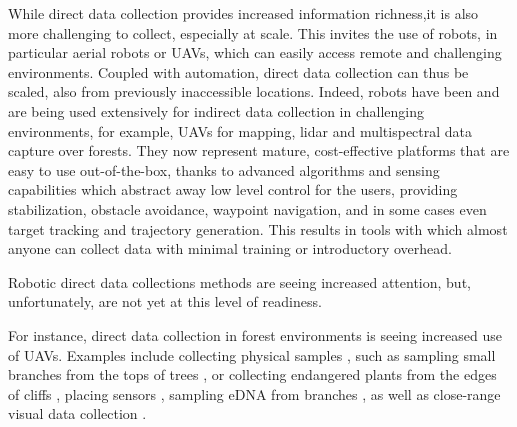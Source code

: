 




While direct data collection provides increased information richness,it is also more challenging to collect, especially at scale. 
This invites the use of robots, in particular aerial robots or UAVs, which can easily access remote and challenging environments. Coupled with automation, direct data collection can thus be scaled, also from previously inaccessible locations.
Indeed, robots have been and are being used extensively for indirect data collection in challenging environments, for example, UAVs for mapping, lidar and multispectral data capture over forests. They now represent mature, cost-effective platforms that are easy to use out-of-the-box, thanks to advanced algorithms and sensing capabilities which abstract away low level control for the users, providing stabilization, obstacle avoidance, waypoint navigation, and in some cases even target tracking and trajectory generation. This results in tools with which almost anyone can collect data with minimal training or introductory overhead. 

Robotic direct data collections methods are seeing increased attention, but, unfortunately, are not yet at this level of readiness.

For instance, direct data collection in forest environments is seeing increased use of UAVs.
Examples include collecting physical samples \cite{Krasylenko2023}, such as sampling small branches from the tops of trees \cite{Charron2020}, or collecting endangered plants from the edges of cliffs \cite{LaVigne2022}, placing sensors \cite{Hamaza2020, Farinha2020}, sampling eDNA from branches \cite{Aucone2023a}, as well as close-range visual data collection \cite{Liu2022, Zhou2022}.

